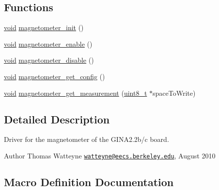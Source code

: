 \subsection*{Functions}
\begin{DoxyCompactItemize}
\item 
\hyperlink{usb__devapi_8h_afabf60e7f57651d6d595a02c75f07cd0}{void} \hyperlink{group___magnetometer_ga76c9f5d503768db8baa63841dcf0aef0}{magnetometer\+\_\+init} ()
\item 
\hyperlink{usb__devapi_8h_afabf60e7f57651d6d595a02c75f07cd0}{void} \hyperlink{group___magnetometer_gac116374f56fac4545ef6cf41aa240568}{magnetometer\+\_\+enable} ()
\item 
\hyperlink{usb__devapi_8h_afabf60e7f57651d6d595a02c75f07cd0}{void} \hyperlink{group___magnetometer_ga748b4588465a18c883991add755b5338}{magnetometer\+\_\+disable} ()
\item 
\hyperlink{usb__devapi_8h_afabf60e7f57651d6d595a02c75f07cd0}{void} \hyperlink{group___magnetometer_gafe2321d262b48ca13e9d7e0402945c1a}{magnetometer\+\_\+get\+\_\+config} ()
\item 
\hyperlink{usb__devapi_8h_afabf60e7f57651d6d595a02c75f07cd0}{void} \hyperlink{group___magnetometer_gaebd426d03abce1296023f5098a99c806}{magnetometer\+\_\+get\+\_\+measurement} (\hyperlink{_p_e___types_8h_aba7bc1797add20fe3efdf37ced1182c5}{uint8\+\_\+t} $\ast$space\+To\+Write)
\end{DoxyCompactItemize}


\subsection{Detailed Description}
Driver for the magnetometer of the G\+I\+N\+A2.\+2b/c board. 

\begin{DoxyAuthor}{Author}
Thomas Watteyne \href{mailto:watteyne@eecs.berkeley.edu}{\tt watteyne@eecs.\+berkeley.\+edu}, August 2010 
\end{DoxyAuthor}


\subsection{Macro Definition Documentation}
